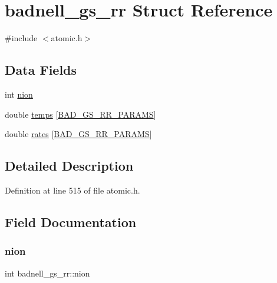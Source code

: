 \hypertarget{structbadnell__gs__rr}{}\section{badnell\+\_\+gs\+\_\+rr Struct Reference}
\label{structbadnell__gs__rr}


{\ttfamily \#include $<$atomic.\+h$>$}

\subsection*{Data Fields}
\begin{DoxyCompactItemize}
\item 
int \hyperlink{structbadnell__gs__rr_af0ab2f7038b9d6c7e70b6f14a36ddbc4}{nion}
\item 
double \hyperlink{structbadnell__gs__rr_ab70f04c8e30cdc551ddc713bc7a42a6c}{temps} \mbox{[}\hyperlink{atomic_8h_acc4d45a47ab17c4546897672a8478d52}{B\+A\+D\+\_\+\+G\+S\+\_\+\+R\+R\+\_\+\+P\+A\+R\+A\+MS}\mbox{]}
\item 
double \hyperlink{structbadnell__gs__rr_aa1c08814c3f5d44f7bf82291a708a138}{rates} \mbox{[}\hyperlink{atomic_8h_acc4d45a47ab17c4546897672a8478d52}{B\+A\+D\+\_\+\+G\+S\+\_\+\+R\+R\+\_\+\+P\+A\+R\+A\+MS}\mbox{]}
\end{DoxyCompactItemize}


\subsection{Detailed Description}


Definition at line 515 of file atomic.\+h.



\subsection{Field Documentation}
\mbox{\label{structbadnell__gs__rr_af0ab2f7038b9d6c7e70b6f14a36ddbc4}} 
\subsubsection{\texorpdfstring{nion}{nion}}
{\footnotesize\ttfamily int badnell\+\_\+gs\+\_\+rr\+::nion}




